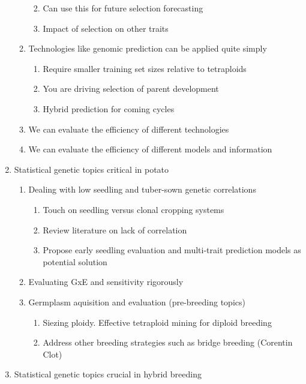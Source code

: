 \documentclass[
]{article}
\providecommand{\tightlist}{%
  \setlength{\itemsep}{0pt}\setlength{\parskip}{0pt}}\usepackage{longtable,booktabs,array}
\begin{document}
\begin{enumerate}
\begin{enumerate}
    \begin{enumerate}
    \def\labelenumiii{\Alph{enumiii}.}
    \tightlist
    \item
      Can use this for future selection forecasting
    \item
      Impact of selection on other traits
    \end{enumerate}
  \item
    Technologies like genomic prediction can be applied quite simply

    \begin{enumerate}
    \def\labelenumiii{\Alph{enumiii}.}
    \tightlist
    \item
      Require smaller training set sizes relative to tetraploids
    \item
      You are driving selection of parent development
    \item
      Hybrid prediction for coming cycles
    \end{enumerate}
  \item
    We can evaluate the efficiency of different technologies
  \item
    We can evaluate the efficiency of different models and information
  \end{enumerate}
\item
  Statistical genetic topics critical in potato

  \begin{enumerate}
  \def\labelenumii{\roman{enumii})}
  \tightlist
  \item
    Dealing with low seedling and tuber-sown genetic correlations

    \begin{enumerate}
    \def\labelenumiii{\Alph{enumiii}.}
    \tightlist
    \item
      Touch on seedling versus clonal cropping systems
    \item
      Review literature on lack of correlation
    \item
      Propose early seedling evaluation and multi-trait prediction
      models as potential solution
    \end{enumerate}
  \item
    Evaluating GxE and sensitivity rigorously
  \item
    Germplasm aquisition and evaluation (pre-breeding topics)

    \begin{enumerate}
    \def\labelenumiii{\Alph{enumiii}.}
    \tightlist
    \item
      Siezing ploidy. Effective tetraploid mining for diploid breeding
    \item
      Address other breeding strategies such as bridge breeding
      (Corentin Clot)
    \end{enumerate}
  \end{enumerate}
\item
  Statistical genetic topics crucial in hybrid breeding


\end{enumerate}
\end{document}

